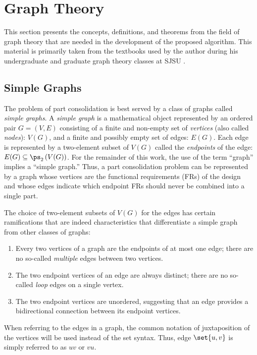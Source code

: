 \section{Graph Theory}

This section presents the concepts, definitions, and theorems from the field of graph theory that are needed in the
development of the proposed algorithm.  This material is primarily taken from the textbooks used
by the author during his undergraduate and graduate graph theory classes at SJSU \cite{chartrand,west}.

\subsection{Simple Graphs}

The problem of part consolidation is best served by a class of graphs called \emph{simple graphs}.  A \emph{simple
  graph} is a mathematical object represented by an ordered pair \(G=(V,E)\) consisting of a finite and non-empty
set of \emph{vertices} (also called \emph{nodes}): \(V(G)\), and a finite and possibly empty set of edges:
\(E(G)\).  Each edge is represented by a two-element subset of \(V(G)\) called the \emph{endpoints} of the edge:
\(E(G)\subseteq\ps_2\left(V(G)\right)\).  For the remainder of this work, the use of the term ``graph'' implies a
``simple graph.''  Thus, a part consolidation problem can be represented by a graph whose vertices are the
functional requirements (FRs) of the design and whose edges indicate which endpoint FRs should never be combined
into a single part.

The choice of two-element subsets of \(V(G)\) for the edges has certain ramifications that are indeed characteristics
that differentiate a simple graph from other classes of graphs:
\begin{enumerate}
\item Every two vertices of a graph are the endpoints of at most one edge; there are no so-called
  \emph{multiple} edges between two vertices.
\item The two endpoint vertices of an edge are always distinct; there are no so-called \emph{loop} edges on a
  single vertex.
\item The two endpoint vertices are unordered, suggesting that an edge provides a bidirectional connection between
  its endpoint vertices.
\end{enumerate}
When referring to the edges in a graph, the common notation of juxtaposition of the vertices will be used instead of
the set syntax.  Thus, edge \(\set{u,v}\) is simply referred to as \(uv\) or \(vu\).


